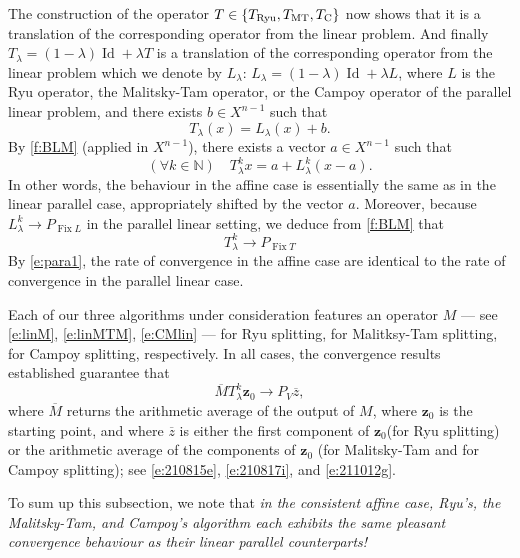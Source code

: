 \documentclass[11pt]{article}
\newcommand{\bz}{\ensuremath{\mathbf{z}}}
\newcommand{\kkk}{\ensuremath{{k\in{\mathbb N}}}}
\newcommand{\Fix}{\ensuremath{\operatorname{Fix}}}
\newcommand{\Id}{\ensuremath{\operatorname{Id}}}
\newcommand{\tryu}{\ensuremath{T_{\text{\scriptsize Ryu}}}}
\newcommand{\tmt}{\ensuremath{T_{\text{\scriptsize MT}}}}
\newcommand{\tc}{\ensuremath{T_{\text{\scriptsize C}}}}
\theoremstyle{definition}
\providecommand{\Id}{\operatorname{{ Id}}}
\providecommand{\Id}{\operatorname{Id}}
\begin{document}
{The construction of the operator $T\in \{\tryu,\tmt,\tc\}$ now shows 
that it is a translation of the corresponding operator from the linear problem.
And finally $T_\lambda = (1-\lambda)\Id+\lambda T$ is a translation of 
the corresponding operator from the linear problem which we denote by $L_\lambda$:
$L_\lambda = (1-\lambda)\Id+\lambda L$, where $L$ is 
the Ryu operator, the Malitsky-Tam operator, or the Campoy operator 
of the parallel linear problem,
and  there exists $b\in X^{n-1}$ such that 
\begin{equation*}
T_\lambda(x) = L_\lambda(x)+b. 
\end{equation*}
By \cref{f:BLM} (applied in $X^{n-1}$), 
there exists a vector $a\in X^{n-1}$ such that 
\begin{equation}
\label{e:para1}
(\forall\kkk)\quad T_\lambda^kx = a + L_\lambda^k(x-a).
\end{equation}
In other words, the behaviour in the affine case is essentially
the same as in the linear parallel case, appropriately shifted by the vector $a$.
Moreover, because $L_\lambda^k\to P_{\Fix L}$ in the parallel linear setting,
we deduce from \cref{f:BLM} that 
\begin{equation*}
T_\lambda^k \to P_{\Fix T}
\end{equation*}
By \cref{e:para1}, the rate of convergence in the affine case are identical
to the rate of convergence in the parallel linear case. 


Each of our three algorithms under consideration features an operator $M$ --- 
see \cref{e:linM}, \cref{e:linMTM}, \cref{e:CMlin} --- 
for Ryu splitting, for Malitksy-Tam splitting, for Campoy splitting,
respectively. In all cases, the convergence results established guarantee that 
\begin{equation*}
\overline{M}T^k_\lambda\bz_0 \to P_V\overline{z}, 
\end{equation*}
where $\overline{M}$ returns the arithmetic average of the output of $M$, 
where $\bz_0$ is the starting point, and  
where $\overline{z}$ is either the first component of $\bz_0$(for Ryu splitting) 
or  the arithmetic average of the components of $\bz_0$ (for Malitsky-Tam and for 
Campoy splitting); 
see
\cref{e:210815e},
\cref{e:210817i}, and
\cref{e:211012g}. 


To sum up this subsection, we note that 
\emph{in the consistent affine case, Ryu's, the Malitsky-Tam, and Campoy's algorithm
each exhibits the same pleasant convergence behaviour as their linear parallel counterparts!}

}
\end{document}
